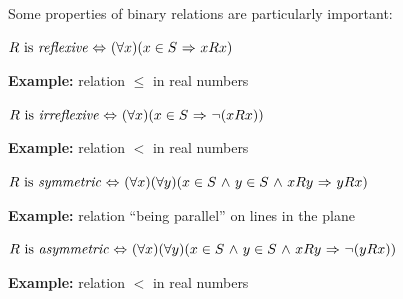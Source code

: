 \documentclass[11pt,paper=b5,footinclude,headinclude]{scrbook} %
\def\inn {{~\wedge~}}
\def\sledi {{~\Rightarrow~}}
\def\cee {{~\Leftrightarrow~}}
\theoremstyle{remark}
\theoremstyle{definition} %
\theoremstyle{theorem} %
\begin{document}
Some properties of binary relations are particularly important:

\bigskip

$R \textrm{ is {\em reflexive}} \cee (\forall x)(x\in S\sledi xRx)$


\textbf{ Example:} relation $\le$ in real numbers

\bigskip

$R \textrm{ is {\em irreflexive}} \cee (\forall x)(x\in S\sledi \neg(xRx))$


\textbf{ Example:} relation  $<$ in real numbers

\bigskip

$R \textrm{ is {\em symmetric}} \cee (\forall x)(\forall y)(x\in S\inn y\in S\inn xRy\sledi yRx)$

%

\textbf{ Example:} relation ``being parallel'' on lines in the plane

\bigskip

$R \textrm{ is {\em asymmetric}} \cee (\forall x)(\forall y)(x\in S\inn y\in S\inn xRy\sledi \neg(yRx))$


\textbf{ Example:} relation  $<$ in real numbers

\end{document}
